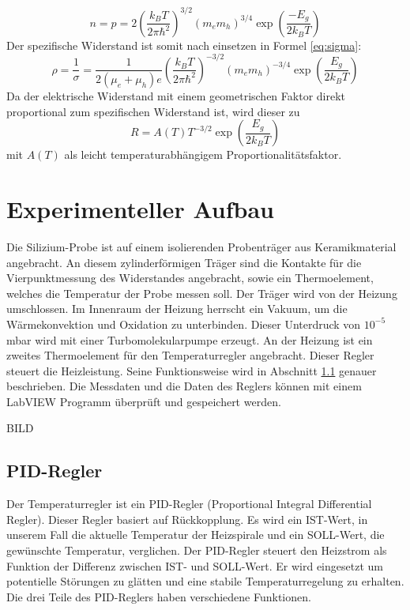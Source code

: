 \documentclass[a4paper,parskip,11pt, DIV12]{scrreprt}
\begin{document}
\begin{equation}
n = p = 2 \left(\frac{k_B T}{2 \pi \hbar^2}\right)^{3/2} (m_e m_h)^{3/4} \exp \left(\frac{-E_g}{2 k_B T}\right)
\end{equation}
Der spezifische Widerstand ist somit nach einsetzen in Formel \ref{eq:sigma}:
\begin{equation}
\rho = \frac{1}{\sigma} = \frac{1}{2 (\mu_e + \mu_h)e} \left(\frac{k_B T}{2 \pi \hbar^2}\right)^{-3/2} (m_e m_h)^{-3/4} \exp \left(\frac{E_g}{2 k_B T}\right)
\end{equation}
Da der elektrische Widerstand mit einem geometrischen Faktor direkt proportional zum spezifischen Widerstand ist, wird dieser zu
\begin{equation}
\label{eq:Endloesung}
R = A(T) T^{-3/2} \exp \left(\frac{E_g}{2 k_B T}\right)
\end{equation}
mit $A(T)$ als leicht temperaturabhängigem Proportionalitätsfaktor. 

\section{Experimenteller Aufbau}
Die Silizium-Probe ist auf einem isolierenden Probenträger aus Keramikmaterial angebracht. An diesem zylinderförmigen Träger sind die Kontakte für die Vierpunktmessung des Widerstandes angebracht, sowie ein Thermoelement, welches die Temperatur der Probe messen soll. Der Träger wird von der Heizung umschlossen. Im Innenraum der Heizung herrscht ein Vakuum, um die Wärmekonvektion und Oxidation zu unterbinden. Dieser Unterdruck von $10^{-5}$ mbar wird mit einer Turbomolekularpumpe erzeugt. An der Heizung ist ein zweites Thermoelement für den Temperaturregler angebracht. Dieser Regler steuert die Heizleistung. Seine Funktionsweise wird in Abschnitt \ref{PID_Regler}  genauer beschrieben. Die Messdaten und die Daten des Reglers können mit einem LabVIEW Programm überprüft und gespeichert werden.

BILD


\subsection{PID-Regler}
\label{PID_Regler}
Der Temperaturregler ist ein PID-Regler (Proportional Integral Differential Regler). Dieser Regler basiert auf Rückkopplung. Es wird ein IST-Wert, in unserem Fall die aktuelle Temperatur der Heizspirale und ein SOLL-Wert, die gewünschte Temperatur, verglichen. Der PID-Regler steuert den Heizstrom als Funktion der Differenz zwischen IST- und SOLL-Wert. Er wird eingesetzt um potentielle Störungen zu glätten und eine stabile Temperaturregelung zu erhalten. Die drei Teile des PID-Reglers haben verschiedene Funktionen.
\end{document}
